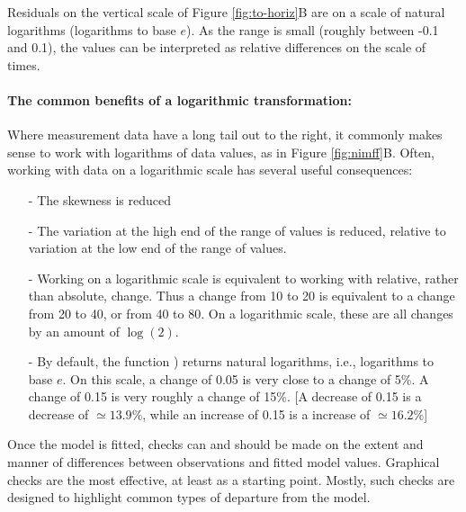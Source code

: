 Residuals on the vertical scale of Figure \ref{fig:to-horiz}B are on a
scale of natural logarithms (logarithms to base $e$).  As the range is
small (roughly between -0.1 and 0.1), the values can be interpreted as relative
differences on the scale of times.


\paragraph{The common benefits of a logarithmic transformation:}

Where measurement data have a long tail out to the right, it
commonly makes sense to work with logarithms of data values, as in Figure
\ref{fig:nimff}B.  Often, working with data on a logarithmic
scale has several useful consequences:
\begin{itemize}
  \item[-] The skewness is reduced
  \item[-] The variation at the high end of the range of values is reduced,
    relative to variation at the low end of the range of values.
  \item[-] Working on a logarithmic scale is equivalent to working
    with relative, rather than absolute, change.  Thus a change from
    10 to 20 is equivalent to a change from 20 to 40, or from 40 to 80.
    On a logarithmic scale, these are all changes by an amount of
    $\log(2)$.
  \item[-] By default, the function ) returns natural
    logarithms, i.e., logarithms to base $e$.  On this scale, a change
    of 0.05 is very close to a change of 5\%.  A change of 0.15 is
    very roughly a change of 15\%.  [A decrease of 0.15 is a decrease
    of $\simeq 13.9\%$, while an increase of 0.15 is a increase of
    $\simeq 16.2\%$]
\end{itemize}

Once the model is fitted, checks can and should be made on the extent
and manner of differences between observations and fitted model
values.  Graphical checks are the most effective, at least as a starting
point. Mostly, such checks are designed to highlight common types of
departure from the model.

